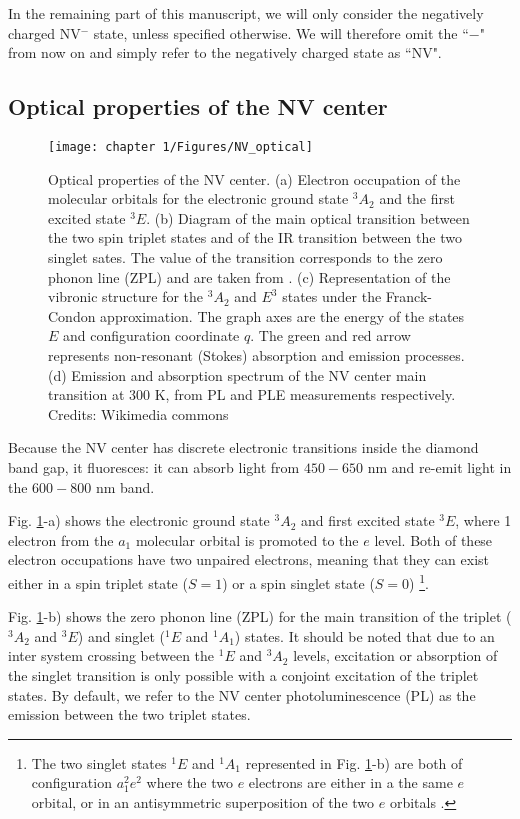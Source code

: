 \documentclass[a4paper, 11pt]{report}
\begin{document}
In the remaining part of this manuscript, we will only consider the negatively charged NV$^-$ state, unless specified otherwise. We will therefore omit the ``$-$" from now on and simply refer to the negatively charged state as ``NV".
\subsection{Optical properties of the NV center}
\begin{figure}[h!]
\centering
\texttt{[image: chapter 1/Figures/NV\_optical]}
\caption{Optical properties of the NV center. (a) Electron occupation of the molecular orbitals for the electronic ground state $^3A_2$ and the first excited state $^3E$. (b) Diagram of the main optical transition between the two spin triplet states and of the IR transition between the two singlet sates. The value of the transition corresponds to the zero phonon line (ZPL) and are taken from \citep{doherty2013nitrogen}. (c) Representation of the vibronic structure for the $^3A_2$ and $E^3$ states under the Franck-Condon approximation. The graph axes are the energy of the states $E$ and configuration coordinate $q$. The green and red arrow represents non-resonant (Stokes) absorption and emission processes. (d) Emission and absorption spectrum of the NV center main transition at 300 K, from PL and PLE measurements respectively. Credits: Wikimedia commons}
\label{NV optical}
\end{figure}

Because the NV center has discrete electronic transitions inside the diamond band gap, it fluoresces: it can absorb light from $450-650$ nm and re-emit light in the $600-800$ nm band.

Fig. \ref{NV optical}-a) shows the electronic ground state $^3A_2$ and first excited state $^3E$, where 1 electron from the $a_1$ molecular orbital is promoted to the $e$ level. Both of these electron occupations have two unpaired electrons, meaning that they can exist either in a spin triplet state ($S=1$) or a spin singlet state ($S=0$) \footnote{The two singlet states $^1E$ and $^1A_1$ represented in Fig. \ref{NV optical}-b) are both of configuration $a_1^2e^2$ where the two $e$ electrons are either in a the same $e$ orbital, or in an antisymmetric superposition of the two $e$ orbitals \citep{doherty2011negatively}.}. 

Fig. \ref{NV optical}-b) shows the zero phonon line (ZPL) for the main transition of the triplet ($^3A_2$ and $^3E$) and singlet ($^1E$ and $^1A_1$) states. It should be noted that due to an inter system crossing between the $^1E$ and $^3A_2$ levels, excitation or absorption of the singlet transition is only possible with a conjoint excitation of the triplet states. By default, we refer to the NV center photoluminescence (PL) as the emission between the two triplet states.
\end{document}
